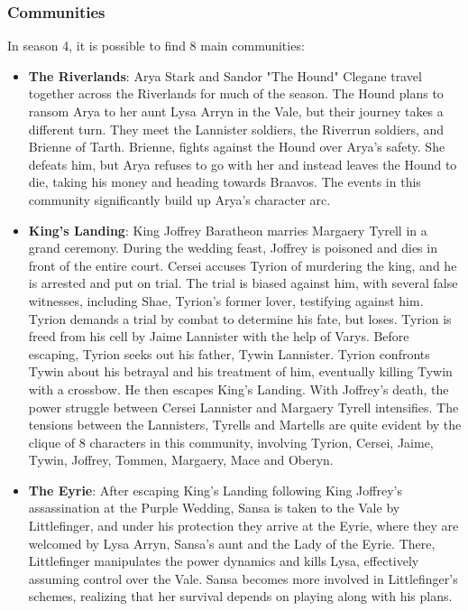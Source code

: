 \documentclass[10pt,twocolumn,letterpaper]{article}
\begin{document}
\subsubsection{Communities}

In season 4, it is possible to find 8 main communities:

\begin{itemize}
    \item \textbf{The Riverlands}: Arya Stark and Sandor "The Hound" Clegane travel together across the Riverlands for much of the season. The Hound plans to ransom Arya to her aunt Lysa Arryn in the Vale, but their journey takes a different turn. They meet the Lannister soldiers, the Riverrun soldiers, and Brienne of Tarth. Brienne, fights against the Hound over Arya's safety. She defeats him, but Arya refuses to go with her and instead leaves the Hound to die, taking his money and heading towards Braavos. The events in this community significantly build up Arya's character arc.
    \item \textbf{King's Landing}: King Joffrey Baratheon marries Margaery Tyrell in a grand ceremony. During the wedding feast, Joffrey is poisoned and dies in front of the entire court. Cersei accuses Tyrion of murdering the king, and he is arrested and put on trial. The trial is biased against him, with several false witnesses, including Shae, Tyrion's former lover, testifying against him. Tyrion demands a trial by combat to determine his fate, but loses. Tyrion is freed from his cell by Jaime Lannister with the help of Varys. Before escaping, Tyrion seeks out his father, Tywin Lannister. Tyrion confronts Tywin about his betrayal and his treatment of him, eventually killing Tywin with a crossbow. He then escapes King's Landing. With Joffrey's death, the power struggle between Cersei Lannister and Margaery Tyrell intensifies. The tensions between the Lannisters, Tyrells and Martells are quite evident by the clique of 8 characters in this community, involving Tyrion, Cersei, Jaime, Tywin, Joffrey, Tommen, Margaery, Mace and Oberyn.
    \item \textbf{The Eyrie}: After escaping King’s Landing following King Joffrey’s assassination at the Purple Wedding, Sansa is taken to the Vale by Littlefinger, and under his protection they arrive at the Eyrie, where they are welcomed by Lysa Arryn, Sansa’s aunt and the Lady of the Eyrie. There, Littlefinger manipulates the power dynamics and kills Lysa, effectively assuming control over the Vale. Sansa becomes more involved in Littlefinger’s schemes, realizing that her survival depends on playing along with his plans.

\end{itemize}
\end{document}
